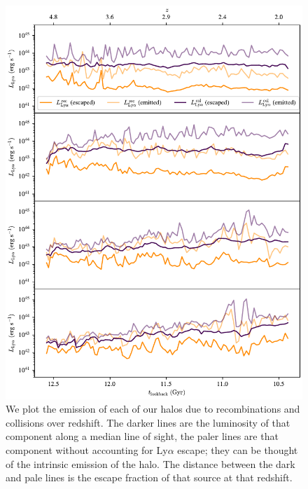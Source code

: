\begin{figure}
    \centering
    \includegraphics[width=\textwidth,height=0.9\textheight,keepaspectratio]{figures/recombination_collision.pdf}
    \caption{
        We plot the emission of each of our halos due to recombinations and collisions over redshift.
        The darker lines are the luminosity of that component along a median line of sight, the paler lines are that component without accounting for Ly$\alpha$ escape; they can be thought of the intrinsic emission of the halo.
        The distance between the dark and pale lines is the escape fraction of that source at that redshift.
    }
    \label{fig:recombination_collision}
\end{figure}

